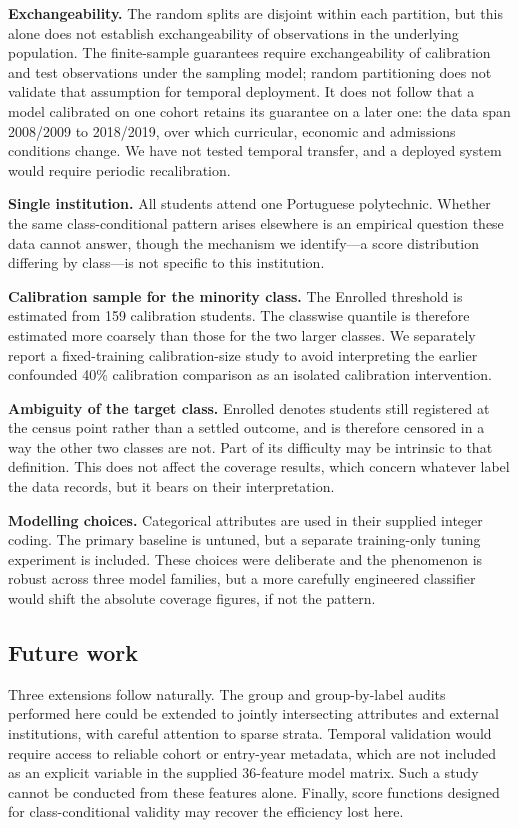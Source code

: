 \textbf{Exchangeability.} The random splits are disjoint within each partition, but this alone does
not establish exchangeability of observations in the underlying population.
The finite-sample guarantees require exchangeability of calibration and
test observations under the sampling model; random partitioning does not
validate that assumption for temporal deployment. It does not follow that a model calibrated on one cohort retains
its guarantee on a later one: the data span 2008/2009 to 2018/2019, over which
curricular, economic and admissions conditions change. We have not tested
temporal transfer, and a deployed system would require periodic recalibration.

\textbf{Single institution.} All students attend one Portuguese polytechnic.
Whether the same class-conditional pattern arises elsewhere is an empirical
question these data cannot answer, though the mechanism we identify---a score
distribution differing by class---is not specific to this institution.

\textbf{Calibration sample for the minority class.} The \textsf{Enrolled}
threshold is estimated from 159 calibration students. The classwise quantile is therefore estimated more coarsely than
those for the two larger classes. We separately report a fixed-training
calibration-size study to avoid interpreting the earlier confounded 40\%
calibration comparison as an isolated calibration intervention.

\textbf{Ambiguity of the target class.} \textsf{Enrolled} denotes students still
registered at the census point rather than a settled outcome, and is therefore
censored in a way the other two classes are not. Part of its difficulty may be
intrinsic to that definition. This does not affect the coverage results, which
concern whatever label the data records, but it bears on their interpretation.

\textbf{Modelling choices.} Categorical attributes are used in their supplied
integer coding. The primary baseline is untuned, but a separate training-only
tuning experiment is included. These choices
were deliberate and the phenomenon is robust across three model families, but a
more carefully engineered classifier would shift the absolute coverage figures,
if not the pattern.

\subsection{Future work}

Three extensions follow naturally. The group and group-by-label audits
performed here could be extended to jointly intersecting attributes and
external institutions, with careful attention to sparse strata. Temporal validation would require access to reliable cohort or entry-year
metadata, which are not included as an explicit variable in the supplied
36-feature model matrix. Such a study cannot be conducted from these
features alone. Finally, score
functions designed for class-conditional validity may recover the efficiency
lost here.


